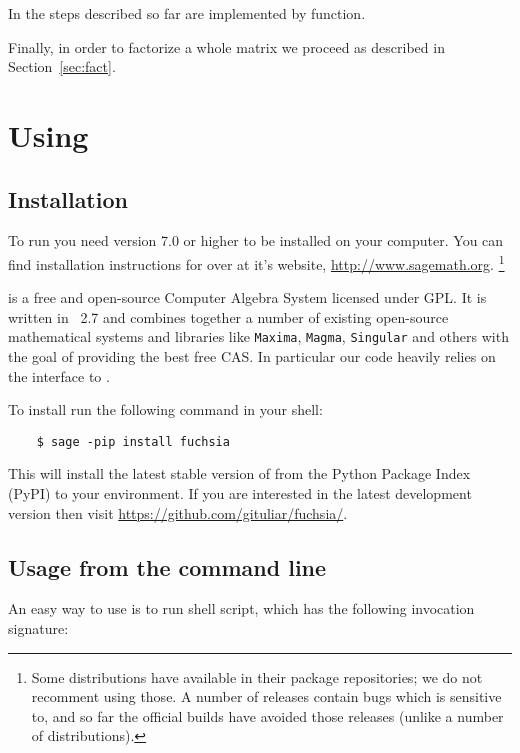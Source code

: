 \documentclass[12pt,a4paper]{article}
\begin{document}
In \fuchsia the steps described so far are implemented by  function.

Finally, in order to factorize a whole matrix we proceed as described in Section~\ref{sec:fact}.


\section{Using \fuchsia}
\label{sec:3}

\subsection{Installation}

To run \fuchsia you need \sage version 7.0 or higher to be installed on your computer.
You can find installation instructions for \sage over at it's website, \url{http://www.sagemath.org}.
\footnote{
    Some \linux distributions have \sage available in their package repositories; we do not recomment using those.
    A number of \maxima releases contain bugs which \fuchsia is sensitive to, and so far the official \sage builds have avoided those releases (unlike a number of \linux distributions).
}

\sage is a free and open-source Computer Algebra System licensed under GPL.
It is written in \python~2.7 and combines together a number of existing open-source mathematical systems and libraries like \texttt{Maxima}, \texttt{Magma}, \texttt{Singular} and others with the goal of providing the best free CAS.
In particular our code heavily relies on the interface to \maxima.

To install \fuchsia run the following command in your shell:

\begin{verbatim}
    $ sage -pip install fuchsia
\end{verbatim}

This will install the latest stable version of \fuchsia from the Python Package Index (PyPI) to your \sage environment.
If you are interested in the latest development version then visit \url{https://github.com/gituliar/fuchsia/}.

\subsection{Usage from the command line}

An easy way to use \fuchsia is to run  shell script, which has the following invocation signature:
\end{document}
